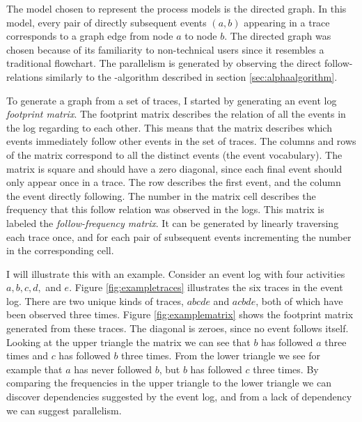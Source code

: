 The model chosen to represent the process models is the directed graph. 
In this model, every pair of directly subsequent events $(a,b)$ appearing in a trace corresponds to a 
graph edge from node $a$ to node $b$.
The directed graph was chosen because of its familiarity to non-technical users since it resembles a traditional flowchart.
The parallelism is generated by observing the direct follow-relations similarly to the \textalpha-algorithm described in section \ref{sec:alphaalgorithm}.

To generate a graph from a set of traces, I started by generating an event log \emph{footprint matrix}.
The footprint matrix describes the relation of all the events in the log regarding to each other.
This means that the matrix describes which events immediately follow other events in the set of traces.
The columns and rows of the matrix correspond to all the distinct events (the event vocabulary).
The matrix is square and should have a zero diagonal, since each final event should only appear once in a trace.
The row describes the first event, and the column the event directly following.
The number in the matrix cell describes the frequency that this follow relation was observed in the logs.
This matrix is labeled the \textit{follow-frequency matrix}.
It can be generated by linearly traversing each trace once, and for each pair of subsequent events incrementing the number in the corresponding cell.

I will illustrate this with an example. Consider an event log with four activities $a,b,c,d,$ and $e$.
Figure \ref{fig:exampletraces} illustrates the six traces in the event log. There are two unique kinds of traces, $abcde$ and $acbde$, both of which have been observed three times. Figure \ref{fig:examplematrix} shows the footprint matrix generated from these traces.
The diagonal is zeroes, since no event follows itself.
Looking at the upper triangle the matrix we can see that $b$ has followed $a$ three times and $c$ has followed $b$ three times. From the lower triangle we see for example that $a$ has never followed $b$, but $b$ has followed $c$ three times.
By comparing the frequencies in the upper triangle to the lower triangle we can discover dependencies suggested by the event log, and from a lack of dependency we can suggest parallelism.

